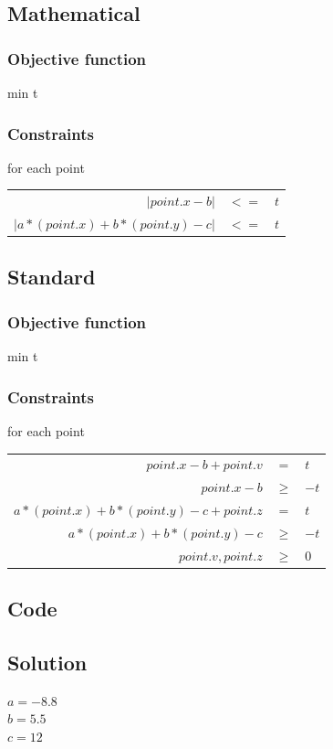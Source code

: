 \documentclass[a4paper,10pt]{article}
\begin{document}
	\subsection{Mathematical}
	\subsubsection{Objective function} 
	min t

	\subsubsection{Constraints}
	for each point

	\begin{tabular}{rcl}
		$|point.x - b|$&$ <= $&$t$\\
		$|a*(point.x)+b*(point.y)-c|$&$ <= $&$t$
	\end{tabular}


	\subsection{Standard}
	\subsubsection{Objective function} 
	min t

	\subsubsection{Constraints}
	for each point

	\begin{tabular}{rcl}
		$point.x - b + point.v$&$ = $&$t$\\
		$point.x - b$&$ \ge $&$-t$\\
		$a*(point.x)+b*(point.y)-c + point.z$&$ = $&$t$\\
		$a*(point.x)+b*(point.y)-c $&$\ge$&$ -t$\\
		$point.v, point.z $&$\ge$&$ 0$
	\end{tabular}

 

	\subsection{Code}
	

	\subsection{Solution}
	$a=-8.8$\\
	$b=5.5$\\
	$c=12$
\end{document}
